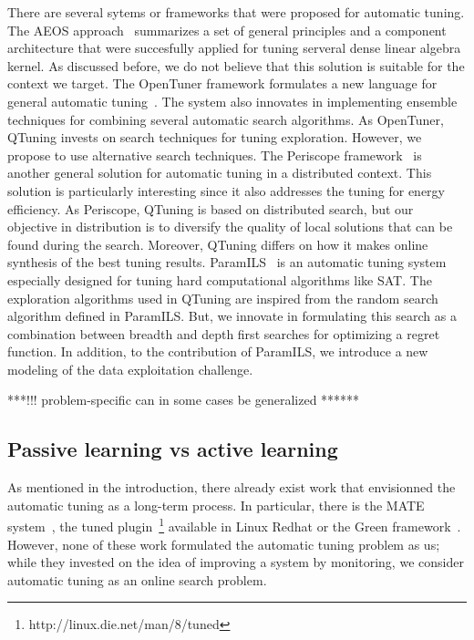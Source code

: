 \documentclass[10pt, conference, compsocconf]{IEEEtran}
\begin{document}
There are several sytems or frameworks that were proposed for automatic tuning. The AEOS approach~\cite{AEOS} 
summarizes a set of general principles and a component architecture that were succesfully applied for tuning  
serveral dense linear algebra kernel. As discussed before, we do not believe that this solution is suitable for the context we target. 
The OpenTuner framework formulates a new language for general automatic tuning~\cite{DBLP:conf/IEEEpact/AnselKVRBOA14}. 
The system also innovates in implementing ensemble techniques for combining several automatic search algorithms. As OpenTuner, QTuning 
invests on search techniques for tuning exploration. However, we propose to use alternative search techniques. 
 The Periscope framework~\cite{DBLP:conf/parco/MijakovicSUGSC13} is another general solution for automatic 
tuning in a distributed context. This solution is particularly interesting since it also addresses the tuning for energy efficiency. 
 As Periscope, QTuning is based on distributed search, but our objective in distribution is to diversify the quality of local solutions 
that can be found during the search. Moreover, QTuning differs on how it makes online synthesis of the best tuning results.
ParamILS~\cite{Hutter:2009:PAA:1734953.1734959} is an automatic tuning system especially designed for tuning hard computational 
algorithms like SAT. The exploration algorithms used in QTuning are inspired from the random search algorithm defined in 
ParamILS. But, we innovate in formulating this search as a combination between breadth and depth first searches for optimizing 
a regret function. In addition, to the contribution of ParamILS, we introduce a new modeling of the data exploitation challenge. 

***!!! problem-specific can in some cases be generalized ******
\subsection{Passive learning vs active learning}


As mentioned in the introduction, there already exist work that envisionned the automatic tuning as a long-term process. In particular, there is the MATE system~\cite{DBLP:conf/para/MorajkoMCMS10}, the tuned plugin~\footnote{http://linux.die.net/man/8/tuned} available 
in Linux Redhat or the Green framework~\cite{Baek:2010:GFS:1809028.1806620}. However, none of these work formulated the 
automatic tuning problem as us; while they invested on the idea of improving a system by monitoring, we consider automatic 
tuning as an online search problem.
\end{document}
